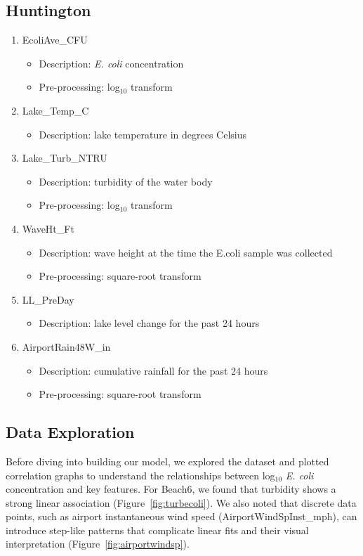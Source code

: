 \subsection{Huntington}
\begin{enumerate}
    \item EcoliAve\_CFU
    \begin{itemize}
        \item Description: \textit{E. coli} concentration
        \item Pre-processing: log$_{10}$ transform
    \end{itemize}
    \item Lake\_Temp\_C
    \begin{itemize}
        \item Description: lake temperature in degrees Celsius
    \end{itemize}
    \item Lake\_Turb\_NTRU
    \begin{itemize}
        \item Description: turbidity of the water body
        \item Pre-processing: log$_{10}$ transform
    \end{itemize}
    \item WaveHt\_Ft
    \begin{itemize}
        \item Description: wave height at the time the E.coli sample was collected
        \item Pre-processing: square-root transform
    \end{itemize}
    \item LL\_PreDay
    \begin{itemize}
        \item Description: lake level change for the past 24 hours
    \end{itemize}
    \item AirportRain48W\_in
    \begin{itemize}
        \item Description: cumulative rainfall for the past 24 hours
        \item Pre-processing: square-root transform
    \end{itemize}
\end{enumerate}


\subsection{Data Exploration}
Before diving into building our model, we explored the dataset and plotted correlation graphs to understand the relationships between log$_{10}$ \textit{E. coli} concentration and key features. For Beach6, we found that turbidity shows a strong linear association (Figure~\ref{fig:turbecoli}). We also noted that discrete data points, such as airport instantaneous wind speed (AirportWindSpInst\_mph), can introduce step-like patterns that complicate linear fits and their visual interpretation (Figure~\ref{fig:airportwindsp}).


